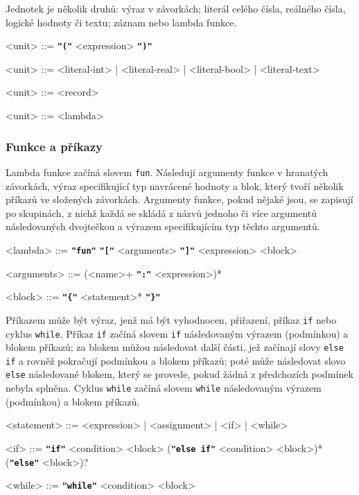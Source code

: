 \documentclass[a4paper,12pt]{article}
\def\quote #1{"#1"}
\def\emphasis #1{\textbf{\texttt{\quote{#1}}}}
\begin{document}
Jednotek je několik druhů: výraz v závorkách; literál celého čísla, reálného čísla, logické hodnoty či textu; záznam nebo lambda funkce.
\begin{grammar}
<unit> ::= \emphasis{(} <expression> \emphasis{)}

<unit> ::= <literal-int> | <literal-real> | <literal-bool> | <literal-text>

<unit> ::= <record>

<unit> ::= <lambda>
\end{grammar}

\subsubsection{Funkce a příkazy}
Lambda funkce začíná slovem \texttt{fun}. Následují argumenty funkce v hranatých závorkách, výraz specifikující typ navrácené hodnoty a blok, který tvoří několik příkazů ve složených závorkách. Argumenty funkce, pokud nějaké jsou, se zapisují po skupinách, z nichž každá se skládá z názvů jednoho či více argumentů následovaných dvojtečkou a výrazem specifikujícím typ těchto argumentů.
\begin{grammar}
<lambda> ::= \emphasis{fun} \emphasis{[} <arguments> \emphasis{]} <expression> <block>

<arguments> ::= (<name>+ \emphasis{:} <expression>)*

<block> ::= \emphasis{\{} <statement>* \emphasis{\}}
\end{grammar}

Příkazem může být výraz, jenž má být vyhodnocen, přiřazení, příkaz \texttt{if} nebo cyklus \texttt{while}. Příkaz \texttt{if} začíná slovem \texttt{if} následovaným výrazem (podmínkou) a blokem příkazů; za blokem můžou následovat další části, jež začínají slovy \texttt{else if} a rovněž pokračují podmínkou a blokem příkazů; poté může následovat slovo \texttt{else} následované blokem, který se provede, pokud žádná z předchozích podmínek nebyla splněna. Cyklus \texttt{while} začíná slovem \texttt{while} následovaným výrazem (podmínkou) a blokem příkazů.
\begin{grammar}
<statement> ::= <expression> | <assignment> | <if> | <while>

<if> ::= \emphasis{if} <condition> <block> (\emphasis{else if} <condition> <block>)* (\emphasis{else} <block>)?

<while> ::= \emphasis{while} <condition> <block>
\end{grammar}
\end{document}
